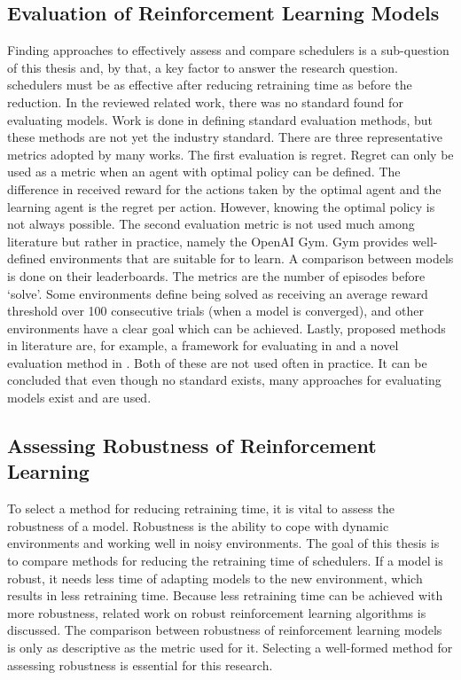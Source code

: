 \subsection{Evaluation of Reinforcement Learning Models}\label{sec:evaluation}

Finding approaches to effectively assess and compare \rlbased schedulers is a
sub-question of this thesis and, by that, a key factor to answer the research
question. \rlbased schedulers must be as effective after reducing retraining
time as before the reduction. In the reviewed related work, there was no
standard found for evaluating \rl models. Work is done in defining standard
evaluation methods, but these methods are not yet the industry standard. There
are three representative metrics adopted by many works. The first evaluation
is regret. Regret can only be used as a metric when an agent with optimal
policy can be defined. The difference in received reward for the actions taken
by the optimal agent and the learning agent is the regret per action. However,
knowing the optimal policy is not always possible. The second evaluation
metric is not used much among literature but rather in practice, namely the
OpenAI Gym. Gym provides well-defined environments that are suitable for \rl
to learn. A comparison between \rl models is done on their
leaderboards. The metrics are
the number of episodes before `solve'. Some environments define being solved
as receiving an average reward threshold over 100 consecutive trials (when a
model is converged), and other environments have a clear goal which can be
achieved. Lastly, proposed methods in literature are, for example, a framework
for evaluating \rl in  and a novel evaluation method in
. Both of these are not used often in practice. It can be
concluded that even though no standard exists, many approaches for evaluating
\rl models exist and are used.


\subsection{Assessing Robustness of Reinforcement Learning}

To select a method for reducing retraining time, it is vital to assess the
robustness of a model. Robustness is the ability to cope with dynamic
environments and working well in noisy environments. The goal of this thesis is
to compare methods for reducing the retraining time of \rlbased schedulers. If
a model is robust, it needs less time of adapting models to the new
environment, which results in less retraining time. Because less
retraining time can be achieved with more robustness, related work on robust
reinforcement learning algorithms is discussed. The comparison between
robustness of reinforcement learning models is only as descriptive as the
metric used for it. Selecting a well-formed method for assessing robustness is
essential for this research.

